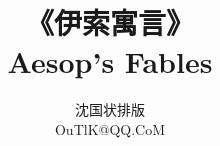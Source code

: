 \documentclass[a4paper, 12pt]{ctexart}
\title{《伊索寓言》\\Aesop's Fables}
\author{沈国状\quad 排版\\OuTlK@QQ.CoM}
\date{}
\begin{document}
    \maketitle
    {
        \small
        \tableofcontents
    }
    \newpage
    
\end{document}
